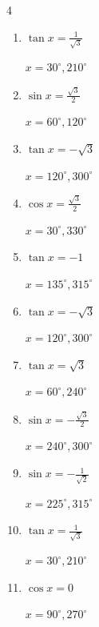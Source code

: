 \begin{multicols}{4}
\begin{enumerate}
        $\displaystyle x = 60^{\circ} , 120^{\circ}$

  \item $\displaystyle \tan{x}  = \frac{1}{\sqrt{3}}$

        $\displaystyle x = 30^{\circ} , 210^{\circ}$

  \item $\displaystyle \sin{x}  = \frac{\sqrt{3}}{2}$

        $\displaystyle x = 60^{\circ} , 120^{\circ}$

  \item $\displaystyle \tan{x}  = -\sqrt{3}$

        $\displaystyle x = 120^{\circ} , 300^{\circ}$

  \item $\displaystyle \cos{x}  = \frac{\sqrt{3}}{2}$

        $\displaystyle x = 30^{\circ} , 330^{\circ}$

  \item $\displaystyle \tan{x}  = -1$

        $\displaystyle x = 135^{\circ} , 315^{\circ}$

  \item $\displaystyle \tan{x}  = -\sqrt{3}$

        $\displaystyle x = 120^{\circ} , 300^{\circ}$

  \item $\displaystyle \tan{x}  = \sqrt{3}$

        $\displaystyle x = 60^{\circ} , 240^{\circ}$

  \item $\displaystyle \sin{x}  = -\frac{\sqrt{3}}{2}$

        $\displaystyle x = 240^{\circ} , 300^{\circ}$

  \item $\displaystyle \sin{x}  = -\frac{1}{\sqrt{2}}$

        $\displaystyle x = 225^{\circ} , 315^{\circ}$

  \item $\displaystyle \tan{x}  = \frac{1}{\sqrt{3}}$

        $\displaystyle x = 30^{\circ} , 210^{\circ}$

\columnbreak %

  \item $\displaystyle \cos{x}  = 0$

        $\displaystyle x = 90^{\circ} , 270^{\circ}$


\end{enumerate}
\end{multicols}
